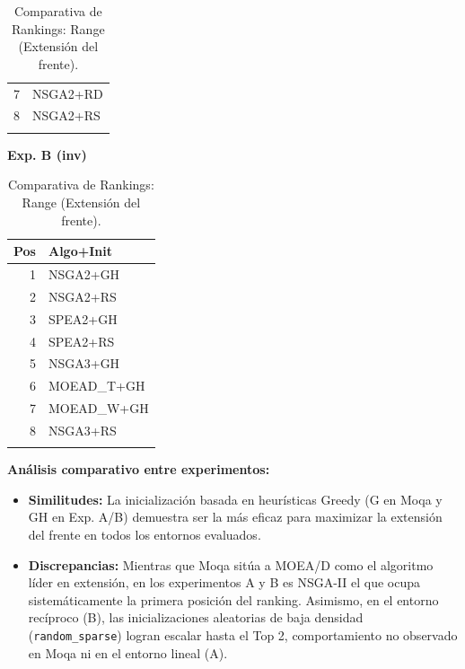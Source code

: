 \documentclass[a4paper,10pt]{article}
\begin{document}
\begin{table}[H]
\begin{minipage}[t]{0.32\textwidth}
\begin{tabular}{rl}
            7 & NSGA2+RD \\
            8 & NSGA2+RS \\
            \\
            \bottomrule
        \end{tabular}
    \end{minipage}
    \hfill
    \begin{minipage}[t]{0.32\textwidth}
        \centering\scriptsize\textbf{Exp. B (inv)}\\
        \begin{tabular}{rl}
            \toprule
            Pos & Algo+Init \\ \midrule
            1 & NSGA2+GH \\
            2 & NSGA2+RS \\
            3 & SPEA2+GH \\
            4 & SPEA2+RS \\
            5 & NSGA3+GH \\
            6 & MOEAD\_T+GH \\
            7 & MOEAD\_W+GH \\
            8 & NSGA3+RS \\
            \\
            \bottomrule
        \end{tabular}
    \end{minipage}
    \caption{Comparativa de Rankings: Range (Extensión del frente).}
\end{table}

\textbf{Análisis comparativo entre experimentos:}
\begin{itemize}
    \item \textbf{Similitudes:} La inicialización basada en heurísticas Greedy (G en Moqa y GH en Exp. A/B) demuestra ser la más eficaz para maximizar la extensión del frente en todos los entornos evaluados. 
    \item \textbf{Discrepancias:} Mientras que Moqa sitúa a MOEA/D como el algoritmo líder en extensión, en los experimentos A y B es NSGA-II el que ocupa sistemáticamente la primera posición del ranking. Asimismo, en el entorno recíproco (B), las inicializaciones aleatorias de baja densidad (\texttt{random\_sparse}) logran escalar hasta el Top 2, comportamiento no observado en Moqa ni en el entorno lineal (A).
\end{itemize}
\end{document}
